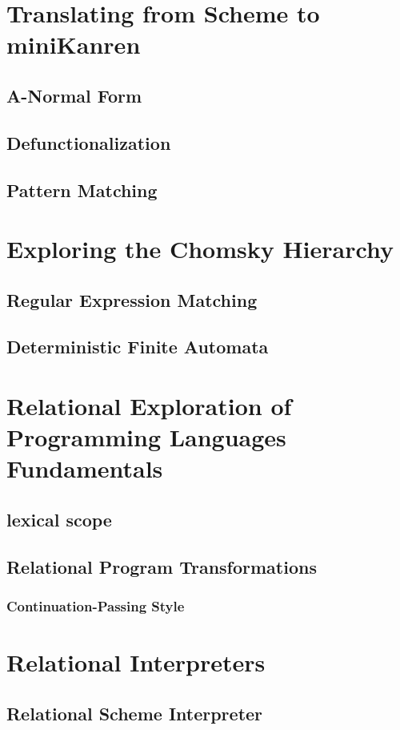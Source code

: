 \documentclass[onecolumn, 11pt, oneside, openright]{book}
\begin{document}
\begin{schemeregion}
\chapter{Translating from Scheme to miniKanren}
\section{A-Normal Form}
\section{Defunctionalization}
\section{Pattern Matching}

\chapter{Exploring the Chomsky Hierarchy}
\section{Regular Expression Matching}
\section{Deterministic Finite Automata}

\chapter{Relational Exploration of Programming Languages Fundamentals}
\section{lexical scope}
\section{Relational Program Transformations}
\subsection{Continuation-Passing Style}

\chapter{Relational Interpreters}
\section{Relational Scheme Interpreter}

\end{schemeregion}
\end{document}
